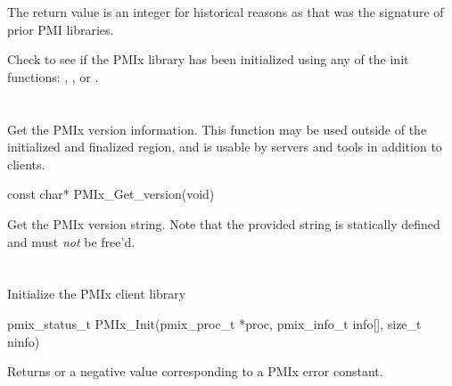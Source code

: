 \rationalestart
The return value is an integer for historical reasons as that was the signature of prior PMI libraries.
\rationaleend

\descr

Check to see if the \ac{PMIx} library has been initialized using any of the init functions:
, , or .

\section{}

\summary

Get the \ac{PMIx} version information. This function may be used outside of the initialized and finalized region, and is usable by servers and tools in addition to clients.

\format

\cspecificstart
\begin{codepar}
const char* PMIx_Get_version(void)
\end{codepar}
\cspecificend

\descr

Get the \ac{PMIx} version string.
Note that the provided string is statically defined and must \textit{not} be free'd.


\section{}

\summary

Initialize the \ac{PMIx} client library

\format

\cspecificstart
\begin{codepar}
pmix_status_t
PMIx_Init(pmix_proc_t *proc,
          pmix_info_t info[], size_t ninfo)
\end{codepar}
\cspecificend

\begin{arglist}
\end{arglist}

Returns  or a negative value corresponding to a \ac{PMIx} error constant.

